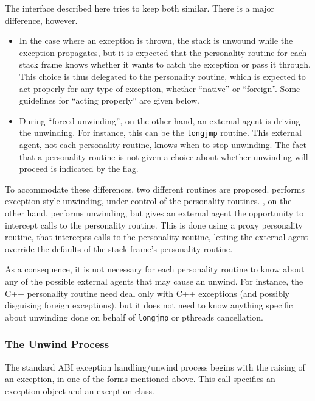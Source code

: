 The interface described here tries to keep both similar. There is a
major difference, however.
\begin{itemize}

\item In the case where an exception is thrown, the stack is unwound
while the exception propagates, but it is expected that the personality
routine for each stack frame knows whether it wants to catch the exception
or pass it through. This choice is thus delegated to the personality
routine, which is expected to act properly for any type of exception,
whether ``native'' or ``foreign''.  Some guidelines for ``acting properly''
are given below.

\item During ``forced unwinding'', on the other hand, an external agent is
driving the unwinding. For instance, this can be the \texttt{longjmp}
routine. This external agent, not each personality routine,
knows when to stop unwinding. The fact that a personality routine is
not given a choice about whether unwinding will proceed is indicated by the
 flag.
\end{itemize}

To accommodate these differences, two different routines are proposed.
 performs exception-style unwinding,
under control of the personality routines. ,
on the other hand, performs unwinding, but gives an external agent the
opportunity to intercept calls to the personality routine. This is done using
a proxy personality routine, that intercepts calls to the personality routine,
letting the external agent override the defaults of the stack frame's
personality routine.

As a consequence, it is not necessary for each personality routine to know
about any of the possible external agents that may cause an unwind. For
instance, the C++ personality routine need deal only with C++ exceptions
(and possibly disguising foreign exceptions), but it does not need to know
anything specific about unwinding done on behalf of \texttt{longjmp} or
pthreads cancellation.

\subsubsection{The Unwind Process}

The standard ABI exception handling/unwind process begins with the raising
of an exception, in one of the forms mentioned above. This call specifies an
exception object and an exception class.

